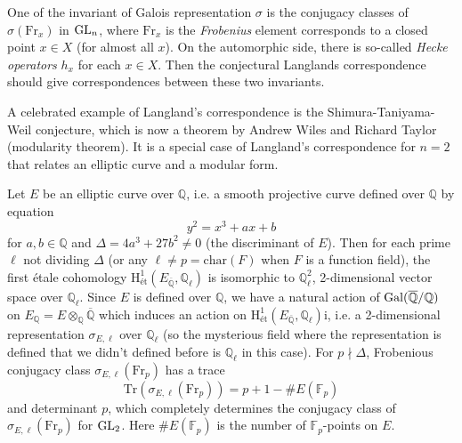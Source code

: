 \begin{enumerate}
    One of the invariant of Galois representation $\sigma$ is the conjugacy classes of $\sigma(\mathrm{Fr}_{x})$ in $\operatorname{\mathrm{GL}}_{n}$, where
    $\mathrm{Fr}_{x}$ is the \emph{Frobenius} element corresponds to a closed point $x \in X$ (for almost all $x$).
    On the automorphic side, there is so-called \emph{Hecke operators} $h_{x}$ for each $x \in X$.
    Then the conjectural Langlands correspondence should give correspondences between these two invariants.
    
\end{enumerate}

A celebrated example of Langland's correspondence is the Shimura-Taniyama-Weil conjecture, which is now a theorem by Andrew Wiles and Richard Taylor (modularity theorem).
It is a special case of Langland's correspondence for $n = 2$ that  relates an elliptic curve and a modular form.

Let $E$ be an elliptic curve over $\mathbb{Q}$, i.e. a smooth projective curve defined over $\mathbb{Q}$ by equation
$$
    y^{2} = x^{3} + ax + b
$$
for $a, b \in \mathbb{Q}$ and $\Delta = 4a^{3} + 27b^{2} \neq 0$ (the discriminant of $E$).
Then for each prime $\ell$ not dividing $\Delta$ (or any $\ell \neq p = \mathrm{char}(F)$ when $F$ is a function field),  the first \'etale cohomology $\mathrm{H}^{1}_{\text{\'et}}(E_{\overline{\mathbb{Q}}}, \mathbb{Q}_{\ell})$ is isomorphic to $\mathbb{Q}_{\ell}^{2}$,
2-dimensional vector space over $\mathbb{Q}_{\ell}$.
Since $E$ is defined over $\mathbb{Q}$, we have a natural action of $\operatorname{\mathrm{Gal}}(\overline{\mathbb{Q}}/\mathbb{Q})$ on $E_{\mathbb{Q}} = E \otimes_{\mathbb{Q}}\overline{\mathbb{Q}}$ which
induces an action on $\mathrm{H}^{1}_{\text{\'et}}(E_{\overline{\mathbb{Q}}}, \mathbb{Q}_{\ell})$i, i.e. a 2-dimensional representation $\sigma_{E, \ell}$ over $\mathbb{Q}_{\ell}$
(so the mysterious field where the representation is defined that we didn't defined before is $\mathbb{Q}_{\ell}$ in this case).
For $p \nmid \Delta$, Frobenious conjugacy class $\sigma_{E, \ell}(\mathrm{Fr}_{p})$ has a trace
$$
    \mathrm{Tr}(\sigma_{E, \ell}(\mathrm{Fr}_{p})) = p + 1 - \# E(\mathbb{F}_{p})
$$
and determinant $p$, which completely determines the conjugacy class of $\sigma_{E, \ell}(\mathrm{Fr}_{p})$ for $\operatorname{\mathrm{GL}}_{2}$.
Here $\#E(\mathbb{F}_{p})$ is the number of $\mathbb{F}_{p}$-points on $E$.

